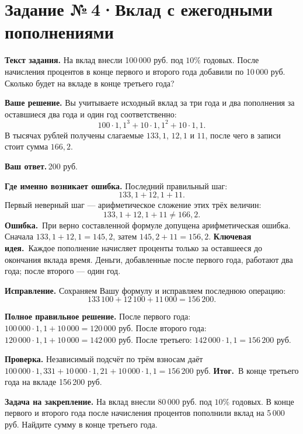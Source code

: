 \documentclass[a4paper,11pt]{article}
\newcommand{\err}{\textcolor{red!75!black}{\textbf{Ошибка.}}\ }
\newcommand{\idea}{\textcolor{accent}{\textbf{Ключевая идея.}}\ }
\newcommand{\result}{\textcolor{accent}{\textbf{Итог.}}\ }
\newcommand{\task}[2]{\clearpage\phantomsection\label{task:#1}\section*{Задание №\,#1\;·\;#2}}
\newcommand{\labelp}[1]{\par\smallskip\textbf{#1.}\enspace}
\begin{document}
\task{4}{Вклад с ежегодными пополнениями}
\labelp{Текст задания} На вклад внесли 100\,000 руб. под $10\%$ годовых. После начисления процентов в конце первого и второго года добавили по 10\,000 руб. Сколько будет на вкладе в конце третьего года?
\labelp{Ваше решение} Вы учитываете исходный вклад за три года и два пополнения за оставшиеся два года и один год соответственно:
\[100\cdot1{,}1^3+10\cdot1{,}1^2+10\cdot1{,}1.\]
В тысячах рублей получены слагаемые $133{,}1$, $12{,}1$ и $11$, после чего в записи стоит сумма $166{,}2$.
\labelp{Ваш ответ} 166\,200 руб.
\labelp{Где именно возникает ошибка} Последний правильный шаг:
\[133{,}1+12{,}1+11.\]
Первый неверный шаг --- арифметическое сложение этих трёх величин:
\[133{,}1+12{,}1+11\ne166{,}2.\]
\err При верно составленной формуле допущена арифметическая ошибка. Сначала $133{,}1+12{,}1=145{,}2$, затем $145{,}2+11=156{,}2$.
\idea Каждое пополнение начисляет проценты только за оставшееся до окончания вклада время. Деньги, добавленные после первого года, работают два года; после второго --- один год.
\labelp{Исправление} Сохраняем Вашу формулу и исправляем последнюю операцию:
\[133\,100+12\,100+11\,000=156\,200.\]
\labelp{Полное правильное решение} После первого года: $100\,000\cdot1{,}1+10\,000=120\,000$ руб. После второго года: $120\,000\cdot1{,}1+10\,000=142\,000$ руб. После третьего: $142\,000\cdot1{,}1=156\,200$ руб.
\labelp{Проверка} Независимый подсчёт по трём взносам даёт $100\,000\cdot1{,}331+10\,000\cdot1{,}21+10\,000\cdot1{,}1=156\,200$ руб.
\result В конце третьего года на вкладе 156\,200 руб.
\labelp{Задача на закрепление} На вклад внесли 80\,000 руб. под $10\%$ годовых. В конце первого и второго года после начисления процентов пополнили вклад на 5\,000 руб. Найдите сумму в конце третьего года.
\end{document}
